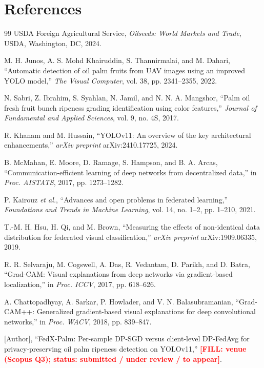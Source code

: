 \documentclass[a4paper,10pt]{article}
\newcommand{\tbd}[1]{\textcolor{red}{\textbf{[FILL: #1]}}}
\begin{document}
\section*{References}
\begin{thebibliography}{99}
USDA Foreign Agricultural Service, \emph{Oilseeds: World Markets and Trade},
USDA, Washington, DC, 2024.

M. H. Junos, A. S. Mohd Khairuddin, S. Thannirmalai, and M. Dahari,
``Automatic detection of oil palm fruits from UAV images using an improved
YOLO model,'' \emph{The Visual Computer}, vol. 38, pp. 2341--2355, 2022.

N. Sabri, Z. Ibrahim, S. Syahlan, N. Jamil, and N. N. A. Mangshor,
``Palm oil fresh fruit bunch ripeness grading identification using color
features,'' \emph{Journal of Fundamental and Applied Sciences}, vol. 9, no.
4S, 2017.

R. Khanam and M. Hussain, ``YOLOv11: An overview of the key architectural
enhancements,'' \emph{arXiv preprint} arXiv:2410.17725, 2024.

B. McMahan, E. Moore, D. Ramage, S. Hampson, and B. A. Arcas,
``Communication-efficient learning of deep networks from decentralized data,''
in \emph{Proc. AISTATS}, 2017, pp. 1273--1282.

P. Kairouz \textit{et al.}, ``Advances and open problems in federated
learning,'' \emph{Foundations and Trends in Machine Learning}, vol. 14, no.
1--2, pp. 1--210, 2021.

T.-M. H. Hsu, H. Qi, and M. Brown, ``Measuring the effects of non-identical
data distribution for federated visual classification,''
\emph{arXiv preprint} arXiv:1909.06335, 2019.

R. R. Selvaraju, M. Cogswell, A. Das, R. Vedantam, D. Parikh, and D. Batra,
``Grad-CAM: Visual explanations from deep networks via gradient-based
localization,'' in \emph{Proc. ICCV}, 2017, pp. 618--626.

A. Chattopadhyay, A. Sarkar, P. Howlader, and V. N. Balasubramanian,
``Grad-CAM++: Generalized gradient-based visual explanations for deep
convolutional networks,'' in \emph{Proc. WACV}, 2018, pp. 839--847.

[Author], ``FedX-Palm: Per-sample DP-SGD versus client-level DP-FedAvg for
privacy-preserving oil palm ripeness detection on YOLOv11,'' \tbd{venue
(Scopus Q3); status: submitted / under review / to appear}.
\end{thebibliography}
\end{document}
